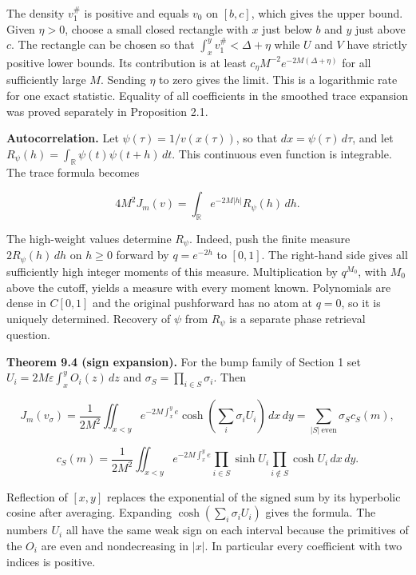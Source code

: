 \documentclass[11pt,letterpaper]{article}
\begin{document}
The density \(v_1^\#\) is positive and equals \(v_0\) on \([b,c]\), which gives the upper
bound. Given \(\eta>0\), choose a small closed rectangle with \(x\) just below \(b\) and
\(y\) just above \(c\). The rectangle can be chosen so that \(\int_x^y v_1^\#<\Delta+\eta\)
while \(U\) and \(V\) have strictly positive lower bounds. Its contribution is at least
\(c_\eta M^{-2}e^{-2M(\Delta+\eta)}\) for all sufficiently large \(M\). Sending \(\eta\) to
zero gives the limit. This is a logarithmic rate for one exact statistic. Equality of all
coefficients in the smoothed trace expansion was proved separately in Proposition 2.1.

\textbf{Autocorrelation.} Let \(\psi(\tau)=1/v(x(\tau))\), so that \(dx=\psi(\tau)\,d\tau\),
and let \(R_\psi(h)=\int_{\mathbb R}\psi(t)\psi(t+h)\,dt\). This continuous even function is
integrable. The trace formula becomes

\[4M^2J_m(v)=\int_{\mathbb R}e^{-2M|h|}R_\psi(h)\,dh.\]

The high-weight values determine \(R_\psi\). Indeed, push the finite measure
\(2R_\psi(h)\,dh\) on \(h\ge0\) forward by \(q=e^{-2h}\) to \([0,1]\). The right-hand side
gives all sufficiently high integer moments of this measure. Multiplication by \(q^{M_0}\),
with \(M_0\) above the cutoff, yields a measure with every moment known. Polynomials are
dense in \(C[0,1]\) and the original pushforward has no atom at \(q=0\), so it is uniquely
determined. Recovery of \(\psi\) from \(R_\psi\) is a separate phase retrieval question.

\noindent\begin{minipage}{\linewidth}
\textbf{Theorem 9.4 (sign expansion).} For the bump family of Section 1 set
\(U_i=2M\varepsilon\int_x^y O_i(z)\,dz\) and \(\sigma_S=\prod_{i\in S}\sigma_i\). Then

\[J_m(v_\sigma)=\frac{1}{2M^2}\iint_{x<y}e^{-2M\int_x^y e}\cosh\!\left(\sum_i\sigma_iU_i\right)\,dx\,dy=\sum_{|S|\ {\mathrm{even}}}\sigma_S c_S(m),\]

\[c_S(m)=\frac{1}{2M^2}\iint_{x<y}e^{-2M\int_x^y e}\prod_{i\in S}\sinh U_i\prod_{i\notin S}\cosh U_i\,dx\,dy.\]
\end{minipage}\par

Reflection of \([x,y]\) replaces the exponential of the signed sum by its hyperbolic cosine
after averaging. Expanding \(\cosh(\sum_i\sigma_i U_i)\) gives the formula. The numbers
\(U_i\) all have the same weak sign on each interval because the primitives of the \(O_i\)
are even and nondecreasing in \(|x|\). In particular every coefficient with two indices is
positive.
\end{document}
